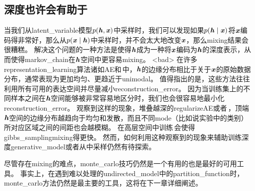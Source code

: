 \subsection{深度也许会有助于}
\label{sec:depth_may_help_mixing}

当我们从\gls{latent_variable}模型$p(\boldsymbol{\mathit{h}},\boldsymbol{\mathit{x}})$中采样时，我们可以发现如果$p(\boldsymbol{\mathit{h}}\mid \boldsymbol{\mathit{x}})$将$\boldsymbol{\mathit{x}}$编码得非常好，那么从$p(\boldsymbol{\mathit{x}} \mid \boldsymbol{\mathit{h}})$中采样时，并不会太大地改变$\boldsymbol{\mathit{x}}$，那么\gls{mixing}结果会很糟糕。
解决这个问题的一种方法是使得$\boldsymbol{\mathit{h}}$成为一种将$\boldsymbol{\mathit{x}}$编码为$\boldsymbol{\mathit{h}}$的深度表示，从而使得\gls{markov_chain}在$\boldsymbol{\mathit{h}}$空间中更容易\gls{mixing}。
<bad> 在许多\gls{representation_learning}算法诸如\gls{AE}和\,中，$\boldsymbol{\mathit{h}}$的边缘分布相比于关于$\boldsymbol{\mathit{x}}$的原始数据分布，通常表现为更加均匀、更趋近于\gls{unimodal}。
值得指出的是，这些方法往往利用所有可用的表达空间并尽量减小\gls{reconstruction_error}。
因为当训练集上的不同样本之间在$\boldsymbol{\mathit{h}}$空间能够被非常容易地区分时，我们也会很容易地最小化\gls{reconstruction_error}。
\citet{Bengio-et-al-ICML2013-small}观察到这样的现象，堆叠越深的\gls{regularize}\gls{AE}或者\,，顶端$\boldsymbol{\mathit{h}}$空间的边缘分布越趋向于均匀和发散，而且不同\gls{mode}（比如说实验中的类别）所对应区域之间的间距也会越模糊。
在高层空间中训练\,会使得\,\gls{gibbs_sampling}\gls{mixing}得更快。
然而，如何利用这种观察到的现象来辅助训练深度\gls{generative_model}或者从中采样仍然有待探索。

尽管存在\gls{mixing}的难点，\gls{monte_carlo}技巧仍然是一个有用的也是最好的可用工具。  %
事实上，在遇到难以处理的\gls{undirected_model}中的\gls{partition_function}时，\gls{monte_carlo}方法仍然是最主要的工具，这将在下一章详细阐述。
